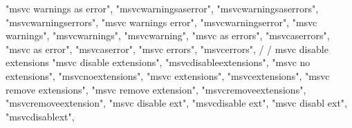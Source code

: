         "msvc warnings as error", 
        "msvcwarningsaserror", 
        "msvcwarningsaserrors", 
        "msvcwarningserrors", 
        "msvc warnings error", 
        "msvcwarningserror", 
        "msvc warnings", 
        "msvcwarnings", 
        "msvcwarning", 
        "msvc as errors", 
        "msvcaserrors", 
        "msvc as error", 
        "msvcaserror", 
        "msvc errors", 
        "msvcerrors", 
        /
        / msvc disable extensions 
        "msvc disable extensions", 
        "msvcdisableextensions", 
        "msvc no extensions", 
        "msvcnoextensions", 
        "msvc extensions", 
        "msvcextensions", 
        "msvc remove extensions", 
        "msvc remove extension", 
        "msvcremoveextensions", 
        "msvcremoveextension", 
        "msvc disable ext", 
        "msvcdisable ext", 
        "msvc disabl ext", 
        "msvcdisablext", 

